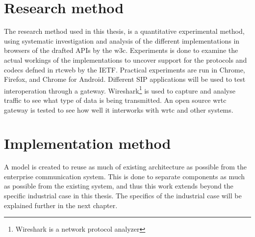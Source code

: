\section{Research method}
The research method used in this thesis, is a quantitative experimental method, using systematic investigation and analysis of the different implementations in browsers of the drafted APIs by the \gls{w3c}. Experiments is done to examine the actual workings of the implementations to uncover support for the protocols and codecs defned in \gls{rtcweb} by the IETF. Practical experiments are run in Chrome, Firefox, and Chrome for Android. Different SIP applications will be used to test interoperation through a gateway. Wireshark\footnote{Wireshark is a network protocol analyzer} is used to capture and analyse traffic to see what type of data is being transmitted. An open source \gls{wrtc} gateway is tested to see how well it interworks with \gls{wrtc} and other systems. 

\section{Implementation method}
A model is created to reuse as much of existing architecture as possible from the enterprise communication system. This is done to separate components as much as possible from the existing system, and thus this work extends beyond the specific industrial case in this thesis. The specifics of the industrial case will be explained further in the next chapter.





